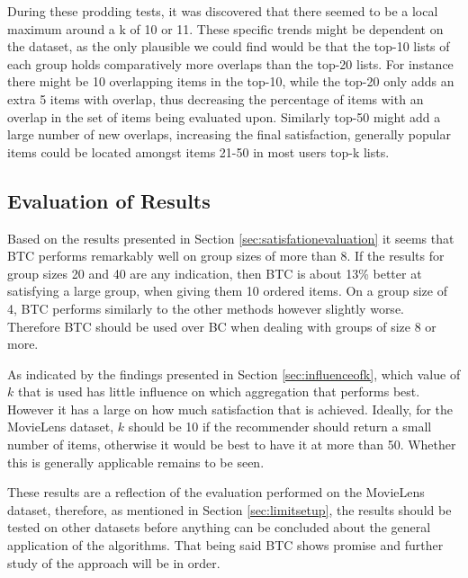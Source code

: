 During these prodding tests, it was discovered that there seemed to be a local maximum around a k of 10 or 11. These specific trends might be dependent on the dataset, as the only plausible we could find would be that the top-10 lists of each group holds comparatively more overlaps than the top-20 lists. For instance there might be 10 overlapping items in the top-10, while the top-20 only adds an extra 5 items with overlap, thus decreasing the percentage of items with an overlap in the set of items being evaluated upon. Similarly top-50 might add a large number of new overlaps, increasing the final satisfaction, generally popular items could be located amongst items 21-50 in most users top-k lists.

\subsection{Evaluation of Results} \label{sec:evaluationofresults}
Based on the results presented in Section \ref{sec:satisfationevaluation} it seems that BTC performs remarkably well on group sizes of more than 8. If the results for group sizes 20 and 40 are any indication, then BTC is about 13\% better at satisfying a large group, when giving them 10 ordered items. On a group size of 4, BTC performs similarly to the other methods however slightly worse. Therefore BTC should be used over BC when dealing with groups of size 8 or more.

As indicated by the findings presented in Section \ref{sec:influenceofk}, which value of $k$ that is used has little influence on which aggregation that performs best. However it has a large on how much satisfaction that is achieved. Ideally, for the MovieLens dataset, $k$ should be 10 if the recommender should return a small number of items, otherwise it would be best to have it at more than 50. Whether this is generally applicable remains to be seen.

These results are a reflection of the evaluation performed on the MovieLens dataset, therefore, as mentioned in Section \ref{sec:limitsetup}, the results should be tested on other datasets before anything can be concluded about the general application of the algorithms. That being said BTC shows promise and further study of the approach will be in order. 









